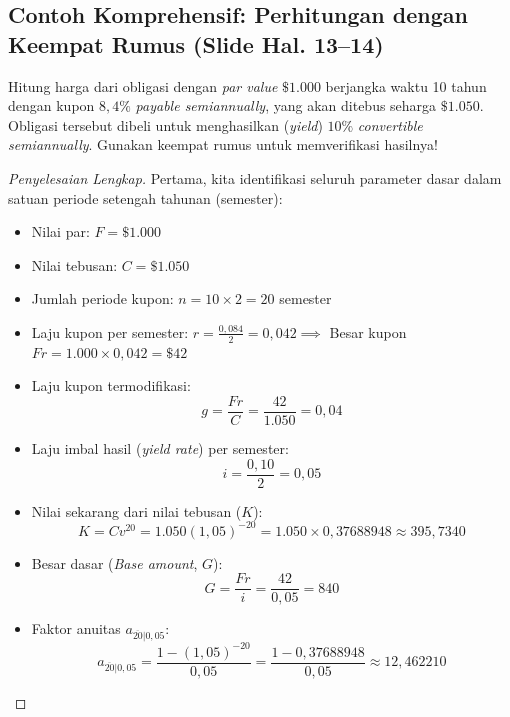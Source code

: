 \documentclass[11pt,a4paper]{article}
\begin{document}
\subsection{Contoh Komprehensif: Perhitungan dengan Keempat Rumus (Slide Hal. 13--14)}

\begin{examplebox}
Hitung harga dari obligasi dengan \textit{par value} $\$1.000$ berjangka waktu 10 tahun dengan kupon $8{,}4\%$ \textit{payable semiannually}, yang akan ditebus seharga $\$1.050$. Obligasi tersebut dibeli untuk menghasilkan (\textit{yield}) $10\%$ \textit{convertible semiannually}. Gunakan keempat rumus untuk memverifikasi hasilnya!
\end{examplebox}

\begin{proof}[Penyelesaian Lengkap]
Pertama, kita identifikasi seluruh parameter dasar dalam satuan periode setengah tahunan (semester):
\begin{itemize}
    \item Nilai par: $F = \$1.000$
    \item Nilai tebusan: $C = \$1.050$
    \item Jumlah periode kupon: $n = 10 \times 2 = 20$ semester
    \item Laju kupon per semester: $r = \frac{0{,}084}{2} = 0{,}042 \implies$ Besar kupon $Fr = 1.000 \times 0{,}042 = \$42$
    \item Laju kupon termodifikasi:
    \begin{equation*}
        g = \frac{Fr}{C} = \frac{42}{1.050} = 0{,}04
    \end{equation*}
    \item Laju imbal hasil (\textit{yield rate}) per semester:
    \begin{equation*}
        i = \frac{0{,}10}{2} = 0{,}05
    \end{equation*}
    \item Nilai sekarang dari nilai tebusan ($K$):
    \begin{equation*}
        K = C v^{20} = 1.050 (1{,}05)^{-20} = 1.050 \times 0{,}37688948 \approx 395{,}7340
    \end{equation*}
    \item Besar dasar (\textit{Base amount}, $G$):
    \begin{equation*}
        G = \frac{Fr}{i} = \frac{42}{0{,}05} = 840
    \end{equation*}
    \item Faktor anuitas $a_{\overline{20}|0{,}05}$:
    \begin{equation*}
        a_{\overline{20}|0{,}05} = \frac{1 - (1{,}05)^{-20}}{0{,}05} = \frac{1 - 0{,}37688948}{0{,}05} \approx 12{,}462210
    \end{equation*}
\end{itemize}


\end{proof}
\end{document}
